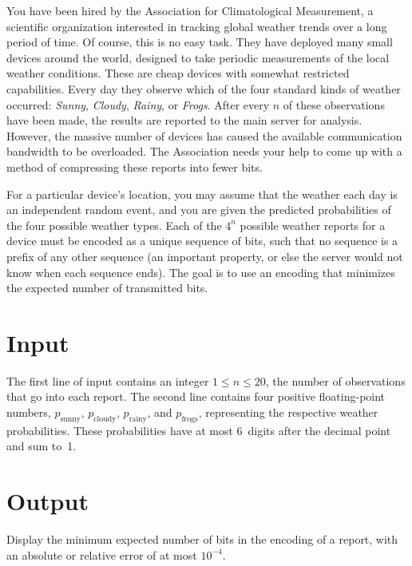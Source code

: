 
%
You have been hired by the Association for Climatological Measurement, a
scientific organization interested in tracking global weather trends over a
long period of time.  Of course, this is no easy task.  They have deployed
many small devices around the world, designed to take periodic
measurements of the local weather conditions.
%
These are cheap devices with somewhat restricted capabilities.
Every day they observe which of the four standard kinds of weather occurred:
\emph{Sunny}, \emph{Cloudy}, \emph{Rainy}, or \emph{Frogs}.  After every $n$ of
these observations have been made, the results are reported to the
main server for analysis.
%
However, the massive number of devices
has caused the available communication bandwidth to be overloaded.
The Association
needs your help to come up with a method of compressing these reports into
fewer bits.

For a particular device's location, you may assume that the weather
each day is an independent random event, and you are given the
predicted probabilities of the four 
possible weather types. Each of the $4^n$ possible weather reports for a
device must be encoded as a unique sequence of bits, such that no
sequence is a prefix of any other sequence (an important property, or
else the server would not know when each sequence ends). The goal
is to use an encoding that minimizes the expected number of
transmitted bits.


\section*{Input}
The first line of input contains an integer $1 \le n \le 20$,
the number of observations that go into each report.
%
The second line contains
four positive floating-point numbers,
$p_{\text{sunny}}$, $p_{\text{cloudy}}$,
$p_{\text{rainy}}$, and $p_{\text{frogs}}$,
representing the respective weather probabilities.
These probabilities have at most 6~digits after the decimal point and
sum to~1.

\section*{Output}
Display the minimum expected number of bits in the encoding of a report, with an
absolute or relative error of at most $10^{-4}$.
